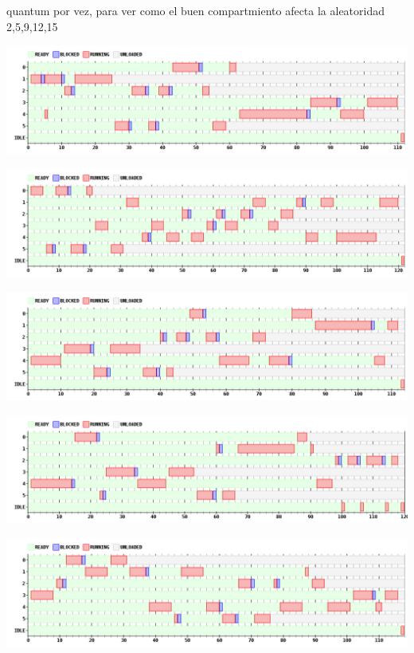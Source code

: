 quantum por vez, para ver como el buen compartmiento afecta la aleatoridad
2,5,9,12,15
\begin {center}
\includegraphics[width=16cm]{../simusched/outputs/loterya.png}
\end {center}
\begin {center}
\includegraphics[width=16cm]{../simusched/outputs/loteryc.png}
\end {center}
\begin {center}
\includegraphics[width=16cm]{../simusched/outputs/loteryd.png}
\end {center}
\begin {center}
\includegraphics[width=16cm]{../simusched/outputs/loterye.png}
\end {center}
\begin {center}
\includegraphics[width=16cm]{../simusched/outputs/loteryf.png}
\end {center}



